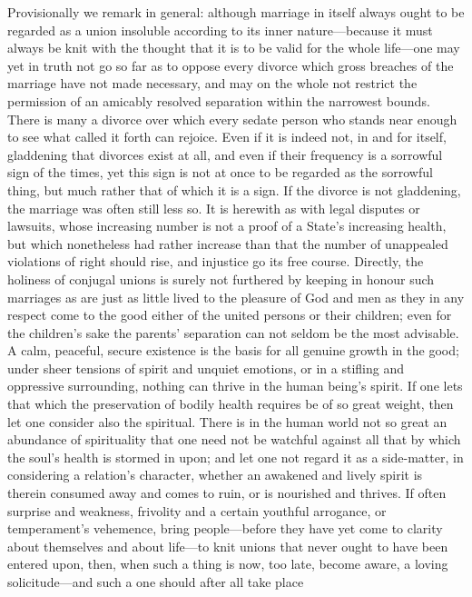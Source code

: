 \documentclass[12pt,a4paper]{book}
\begin{document}
Provisionally we remark in general: although marriage in itself always
ought to be regarded as a union insoluble according to its inner
nature---because it must always be knit with the thought that it is to be
valid for the whole life---one may yet in truth not go so far as to oppose
every divorce which gross breaches of the marriage have not made necessary,
and may on the whole not restrict the permission of an amicably resolved
separation within the narrowest bounds. There is many a divorce over which
every sedate person who stands near enough to see what called it forth can
rejoice. Even if it is indeed not, in and for itself, gladdening that
divorces exist at all, and even if their frequency is a sorrowful sign of
the times, yet this sign is not at once to be regarded as the sorrowful
thing, but much rather that of which it is a sign. If the divorce is not
gladdening, the marriage was often still less so. It is herewith as with
legal disputes or lawsuits, whose increasing number is not a proof of a
State's increasing health, but which nonetheless had rather increase than
that the number of unappealed violations of right should rise, and
injustice go its free course. Directly, the holiness of conjugal unions is
surely not furthered by keeping in honour such marriages as are just as
little lived to the pleasure of God and men as they in any respect come to
the good either of the united persons or their children; even for the
children's sake the parents' separation can not seldom be the most
advisable. A calm, peaceful, secure existence is the basis for all genuine
growth in the good; under sheer tensions of spirit and unquiet emotions, or
in a stifling and oppressive surrounding, nothing can thrive in the human
being's spirit. If one lets that which the preservation of bodily health
requires be of so great weight, then let one consider also the spiritual.
There is in the human world not so great an abundance of spirituality that
one need not be watchful against all that by which the soul's health is
stormed in upon; and let one not regard it as a side-matter, in considering
a relation's character, whether an awakened and lively spirit is therein
consumed away and comes to ruin, or is nourished and thrives. If often
surprise and weakness, frivolity and a certain youthful arrogance, or
temperament's vehemence, bring people---before they have yet come to
clarity about themselves and about life---to knit unions that never ought
to have been entered upon, then, when such a thing is now, too late, become
aware, a loving solicitude---and such a one should after all take place
\end{document}
